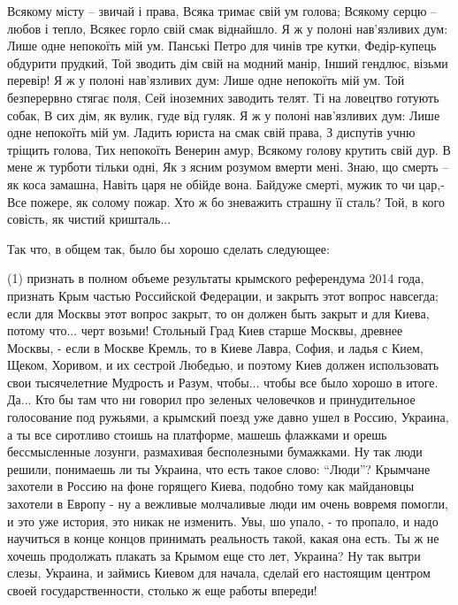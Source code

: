 \raggedcolumns
\begin{multicols}{2} %
\setlength{\parindent}{0pt}
\obeycr
Всякому місту – звичай і права,
Всяка тримає свій ум голова;
Всякому серцю – любов і тепло,
Всякеє горло свій смак віднайшло.
Я ж у полоні нав’язливих дум:
Лише одне непокоїть мій ум.
\smallskip
Панські Петро для чинів тре кутки,
Федір-купець обдурити прудкий,
Той зводить дім свій на модний манір,
Інший гендлює, візьми перевір!
Я ж у полоні нав’язливих дум:
Лише одне непокоїть мій ум.
\smallskip
Той безперервно стягає поля,
Сей іноземних заводить телят.
Ті на ловецтво готують собак,
В сих дім, як вулик, гуде від гуляк.
Я ж у полоні нав’язливих дум:
Лише одне непокоїть мій ум.
\smallskip
Ладить юриста на смак свій права,
З диспутів учню тріщить голова,
Тих непокоїть Венерин амур,
Всякому голову крутить свій дур.
В мене ж турботи тільки одні,
Як з ясним розумом вмерти мені.
\smallskip
Знаю, що смерть – як коса замашна,
Навіть царя не обійде вона.
Байдуже смерті, мужик то чи цар,-
Все пожере, як солому пожар.
Хто ж бо зневажить страшну її сталь?
Той, в кого совість, як чистий кришталь...
\restorecr
\end{multicols} %

Так что, в общем так, было бы хорошо сделать следующее:

(1) признать в полном объеме результаты крымского референдума 2014 года,
признать Крым частью Российской Федерации, и закрыть этот вопрос навсегда; если
для Москвы этот вопрос закрыт, то он должен быть закрыт и для Киева, потому
что...  черт возьми! Стольный Град Киев старше Москвы, древнее Москвы, - если в
Москве Кремль, то в Киеве Лавра, София, и ладья с Кием, Щеком, Хоривом, и их
сестрой Любедью, и поэтому Киев должен использовать свои тысячелетние Мудрость
и Разум, чтобы... чтобы все было хорошо в итоге.  Да... Кто бы там что ни
говорил про зеленых человечков и принудительное голосование под ружьями, а
крымский поезд уже давно ушел в Россию, Украина, а ты все сиротливо стоишь на
платформе, машешь флажками и орешь бессмысленные лозунги, размахивая
бесполезными бумажками. Ну так люди решили, понимаешь ли ты Украина, что есть
такое слово: \enquote{Люди}? Крымчане захотели в Россию на фоне горящего Киева,
подобно тому как майдановцы захотели в Европу - ну а вежливые молчаливые люди
им очень вовремя помогли, и это уже история, это никак не изменить. Увы, шо
упало, - то пропало, и надо научиться в конце концов принимать реальность
такой, какая она есть. Ты ж не хочешь продолжать плакать за Крымом еще сто лет,
Украина? Ну так вытри слезы, Украина, и займись Киевом для начала, сделай его
настоящим центром своей государственности, столько ж еще работы впереди!

